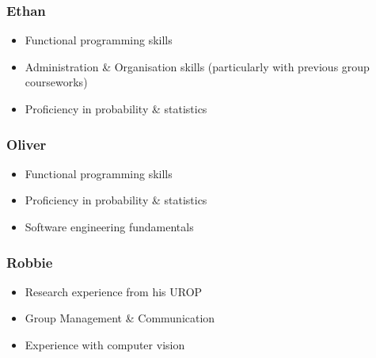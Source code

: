 \documentclass{report}
\begin{document}
\hfill
\begin{minipage}[t]{.48\textwidth}
\subsubsection{Ethan}
\begin{itemize}
\setlength\itemsep{0em}
    \item Functional programming skills
    \item Administration \& Organisation skills (particularly with previous group courseworks)
    \item Proficiency in probability \& statistics
\end{itemize}
\subsubsection{Oliver}
\begin{itemize}
    \setlength\itemsep{0em}
    \item Functional programming skills
    \item Proficiency in probability \& statistics
    \item Software engineering fundamentals
\end{itemize}
\subsubsection{Robbie}
\begin{itemize}
\setlength\itemsep{0em}
    \item Research experience from his UROP
    \item Group Management \& Communication
    \item Experience with computer vision
\end{itemize}
\end{minipage}
\end{document}
